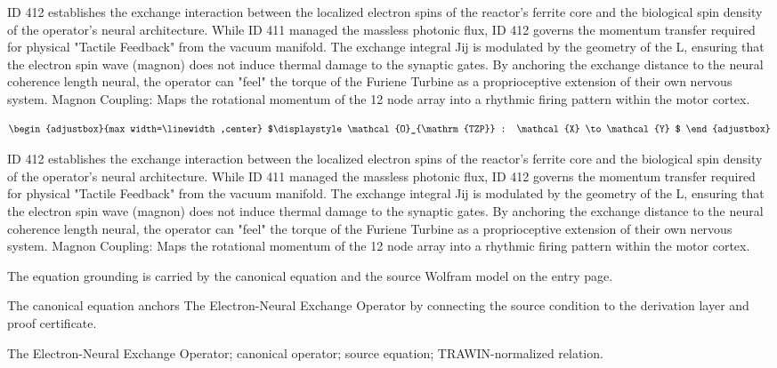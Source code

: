 ID 412 establishes the exchange interaction between the localized electron spins of the reactor's ferrite core and the biological spin density of the operator's neural architecture. While ID 411 managed the massless photonic flux, ID 412 governs the momentum transfer required for physical "Tactile Feedback" from the vacuum manifold. The exchange integral Jij is modulated by the geometry of the L, ensuring that the electron spin wave (magnon) does not induce thermal damage to the synaptic gates. By anchoring the exchange distance to the neural coherence length neural, the operator can "feel" the torque of the Furiene Turbine as a proprioceptive extension of their own nervous system. Magnon Coupling: Maps the rotational momentum of the 12 node array into a rhythmic firing pattern within the motor cortex.

\[
\begin{adjustbox}{max width=\linewidth,center}
$\displaystyle
\mathcal{O}_{\mathrm{TZP}} : \mathcal{X} \to \mathcal{Y}
$
\end{adjustbox}
\]

ID 412 establishes the exchange interaction between the localized electron spins of the reactor's ferrite core and the biological spin density of the operator's neural architecture. While ID 411 managed the massless photonic flux, ID 412 governs the momentum transfer required for physical "Tactile Feedback" from the vacuum manifold. The exchange integral Jij is modulated by the geometry of the L, ensuring that the electron spin wave (magnon) does not induce thermal damage to the synaptic gates. By anchoring the exchange distance to the neural coherence length neural, the operator can "feel" the torque of the Furiene Turbine as a proprioceptive extension of their own nervous system. Magnon Coupling: Maps the rotational momentum of the 12 node array into a rhythmic firing pattern within the motor cortex.

The equation grounding is carried by the canonical equation and the source Wolfram model on the entry page.

The canonical equation anchors The Electron-Neural Exchange Operator by connecting the source condition to the derivation layer and proof certificate.

The Electron-Neural Exchange Operator; canonical operator; source equation; TRAWIN-normalized relation.
\endgroup

